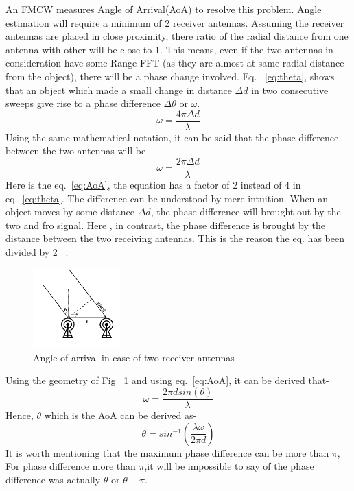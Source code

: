 An FMCW measures Angle of Arrival(AoA) to resolve this problem. Angle estimation will require a minimum of 2 receiver antennas. Assuming the receiver antennas are placed in close proximity, there ratio of the radial distance from one antenna with other will be close to 1. This means, even if the two antennas in consideration have some Range FFT (as they are almost at same radial distance from the object), there will be a phase change involved. Eq. ~\ref{eq:theta}, shows that an object which made a small change in distance $\Delta d$ in two consecutive sweeps give rise to a phase difference $\Delta \theta$ or $\omega$.
\[\omega= \frac{4\pi \Delta d}{\lambda}\]
Using the same mathematical notation, it can be said that the phase difference between the two antennas will be
\begin{equation}\label{eq:AoA}
\omega= \frac{2\pi \Delta d}{\lambda}    
\end{equation}
Here is the eq.~\ref{eq:AoA}, the equation has a factor of 2 instead of 4 in eq.~\ref{eq:theta}. The difference can be understood by mere intuition. When an object moves by some distance $\Delta d$, the phase difference will brought out by the two and fro signal. Here , in contrast, the phase difference is brought by the distance between the two receiving antennas. This is the reason the eq. has been divided by 2 ~\cite{rao_2017}.
 \begin{figure}[ht]
  \begin{center}
    \includegraphics[width=0.3\textwidth]{Master's thesis/images/AoA.PNG} 
    \caption{Angle of arrival in case of two receiver antennas}
    \label{fig:AoA}
  \end{center}
\end{figure}  
Using the geometry of Fig ~\ref{fig:AoA} and using eq.~\ref{eq:AoA}, it can be derived that-
\[\omega= \frac{2\pi dsin(\theta)}{\lambda}\]
Hence, $\theta$ which is the AoA can be derived as-
\begin{equation}
    \theta= sin^{-1}(\frac{\lambda\omega}{2\pi d})
\end{equation}
It is worth mentioning that the maximum phase difference can be more than $\pi$, For phase difference more than $\pi$,it will be impossible to say of the phase difference was actually $\theta$ or $\theta-\pi$.

